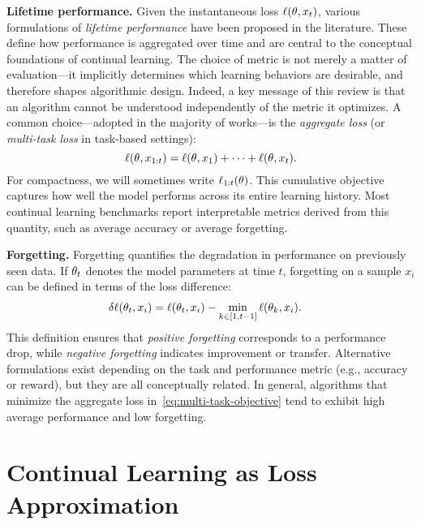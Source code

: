 \documentclass[10pt]{article} %
\begin{document}
\vspace{0.5em}
\noindent\textbf{Lifetime performance.}
Given the instantaneous loss $\ell(\theta, x_t)$, various formulations of \emph{lifetime performance} have been proposed in the literature.  
These define how performance is aggregated over time and are central to the conceptual foundations of continual learning.  
The choice of metric is not merely a matter of evaluation—it implicitly determines which learning behaviors are desirable, and therefore shapes algorithmic design.  
Indeed, a key message of this review is that an algorithm cannot be understood independently of the metric it optimizes.  
A common choice—adopted in the majority of works—is the \emph{aggregate loss} (or \emph{multi-task loss} in task-based settings):
\begin{equation}
\label{eq:multi-task-objective}
    \ell(\theta, x_{1:t}) = \ell(\theta, x_1) + \dots + \ell(\theta, x_t) .
\end{equation}
For compactness, we will sometimes write $\ell_{1:t}(\theta)$.
This cumulative objective captures how well the model performs across its entire learning history.  
Most continual learning benchmarks report interpretable metrics derived from this quantity, such as average accuracy or average forgetting.

\vspace{0.5em}
\noindent\textbf{Forgetting.}
Forgetting quantifies the degradation in performance on previously seen data.  
If $\theta_t$ denotes the model parameters at time $t$, forgetting on a sample $x_i$ can be defined in terms of the loss difference:
\begin{align}
\label{eq:forgetting}
    \delta \ell(\theta_t, x_i)
    &= \ell(\theta_t, x_i) - \min_{k \in [1, t-1]} \ell(\theta_k, x_i).
\end{align}
This definition ensures that \emph{positive forgetting} corresponds to a performance drop, while \emph{negative forgetting} indicates improvement or transfer.  
Alternative formulations exist depending on the task and performance metric (e.g., accuracy or reward), but they are all conceptually related.  
In general, algorithms that minimize the aggregate loss in~\cref{eq:multi-task-objective} tend to exhibit high average performance and low forgetting.


\section{Continual Learning as Loss Approximation}
\label{sec:loss-approximation}
\end{document}
